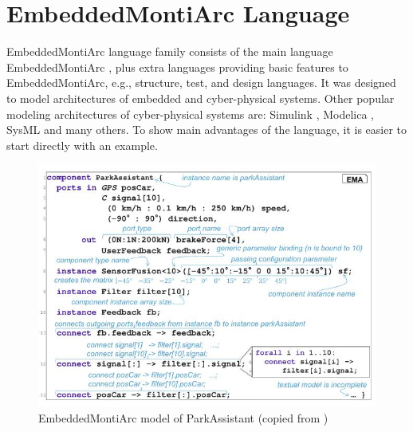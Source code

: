 \section{EmbeddedMontiArc Language} \label{sec:ema}
EmbeddedMontiArc language family consists of the main language EmbeddedMontiArc \cite{KRRW17,EMArt18, report1, report2}, plus extra languages providing basic features to EmbeddedMontiArc, e.g., structure, test, and design languages. It was designed to model architectures of embedded and cyber-physical systems. Other popular modeling architectures of cyber-physical systems are: Simulink \cite{bishop1996modern, dabney2004mastering}, Modelica \cite{modelica2005modelica, fritzson2011modelica}, SysML \cite{omg2007systems, hause2006sysml} and many others. To show main advantages of the language, it is easier to start directly with an example.
\begin{figure}[h!]
    \centering
    \includegraphics[width=\linewidth]{src/pic/embdmontiarc1}
    \caption{EmbeddedMontiArc model of ParkAssistant (copied from \cite{KRRW17})} 
    \label{fig:embdmontiarc}
\end{figure}
